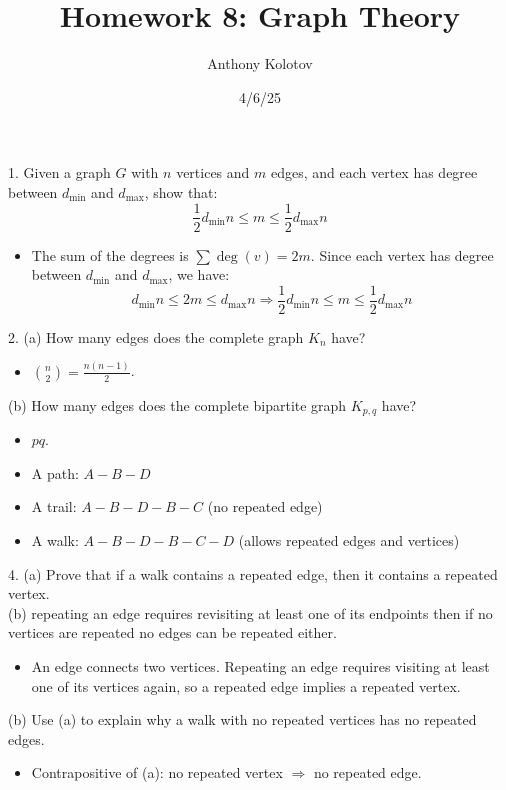 \documentclass[12pt]{article}
\title{Homework 8: Graph Theory}
\date{4/6/25}
\author{Anthony Kolotov}
\begin{document}
	\maketitle
	
	1. Given a graph $G$ with $n$ vertices and $m$ edges, and each vertex has degree between $d_{\text{min}}$ and $d_{\text{max}}$, show that:
	\[ \frac{1}{2} d_{\text{min}} n \le m \le \frac{1}{2} d_{\text{max}} n \]
	\begin{itemize}
		\item The sum of the degrees is $\sum \deg(v) = 2m$. Since each vertex has degree between $d_{\text{min}}$ and $d_{\text{max}}$, we have:
		\[ d_{\text{min}} n \le 2m \le d_{\text{max}} n \Rightarrow \frac{1}{2} d_{\text{min}} n \le m \le \frac{1}{2} d_{\text{max}} n \]
	\end{itemize}
	
	2. (a) How many edges does the complete graph $K_n$ have?
	\begin{itemize}
		\item $\binom{n}{2} = \frac{n(n-1)}{2}$.
	\end{itemize}
	(b) How many edges does the complete bipartite graph $K_{p,q}$ have?
	\begin{itemize}
		\item $pq$.
	\end{itemize}
	
	\begin{itemize}
		\item A path: $A - B - D$
		\item A trail: $A - B - D - B - C$ (no repeated edge)
		\item A walk: $A - B - D - B - C - D$ (allows repeated edges and vertices)
	\end{itemize}
	
	
	4. (a) Prove that if a walk contains a repeated edge, then it contains a repeated vertex.  \\ (b) repeating an edge requires revisiting at least one of its endpoints then if no vertices are repeated no edges can be repeated either.
		
	\begin{itemize}
		\item An edge connects two vertices. Repeating an edge requires visiting at least one of its vertices again, so a repeated edge implies a repeated vertex.
	\end{itemize}
	(b) Use (a) to explain why a walk with no repeated vertices has no repeated edges.
	\begin{itemize}
		\item Contrapositive of (a): no repeated vertex $\Rightarrow$ no repeated edge.
	\end{itemize}
	
\end{document}
